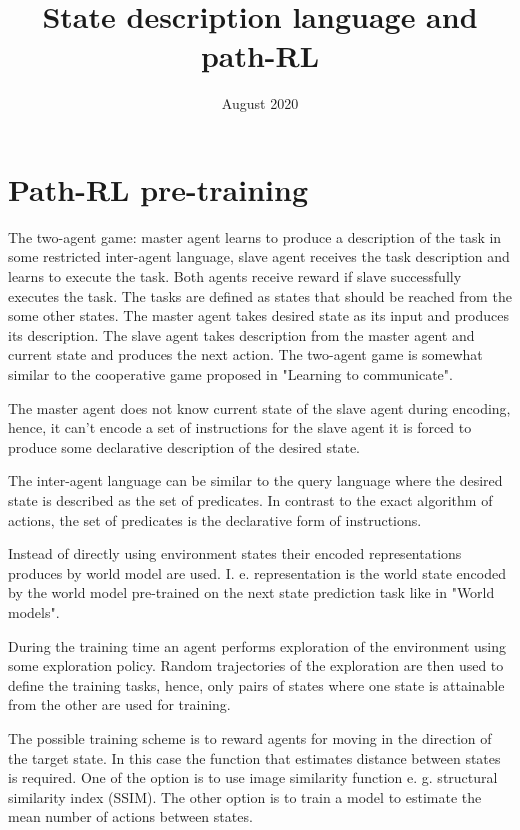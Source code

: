 \documentclass{article}
\title{State description language and path-RL}
\author{}
\date{August 2020}
\begin{document}
\maketitle

\section{Path-RL pre-training}

The two-agent game: master agent learns to produce a description of the task in some restricted inter-agent language, slave agent receives the task description and learns to execute the task. Both agents receive reward if slave successfully executes the task. The tasks are defined as states that should be reached from the some other states. The master agent takes desired state as its input and produces its description. The slave agent takes description from the master agent and current state and produces the next action. The two-agent game is somewhat similar to the cooperative game proposed in "Learning to communicate".

The master agent does not know current state of the slave agent during encoding, hence, it can't encode a set of instructions for the slave agent it is forced to produce some declarative description of the desired state.

The inter-agent language can be similar to the query language where the desired state is described as the set of predicates. In contrast to the exact algorithm of actions, the set of predicates is the declarative form of instructions.

Instead of directly using environment states their encoded representations produces by world model are used. I. e. representation is the world state encoded by the world model pre-trained on the next state prediction task like in "World models".

During the training time an agent performs exploration of the environment using some exploration policy. Random trajectories of the exploration are then used to define the training tasks, hence, only pairs of states where one state is attainable from the other are used for training.

The possible training scheme is to reward agents for moving in the direction of the target state. In this case the function that estimates distance between states is required. One of the option is to use image similarity function e. g. structural similarity index (SSIM). The other option is to train a model to estimate the mean number of actions between states.
\end{document}
